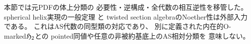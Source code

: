 \begin{remark}[一般定理への依存と未証明の比較]
\label{rem:qa-as-classification-scope}
本節では元PDFの体上分類の
必要性・逆構成・全代数の相互逆性を移管した。
spherical helix実現の一般定理
\cite[Theorem 5]{OkawaUedaSpherical2020}と
twisted section algebraのNoether性は外部入力である。
これはAS代数の同型類の対応であり、
別に定義された内在的O-marked$\mathfrak H_2$との
pointed同値や任意の非被約基底上のAS相対分類を
意味しない。
\end{remark}
